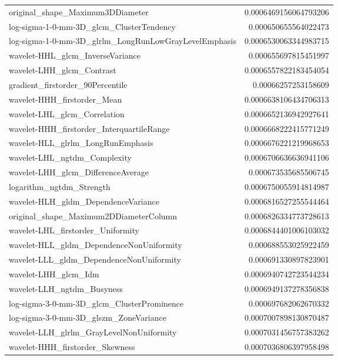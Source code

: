 {\begin{xltabular}[H]{\textwidth}{X r}
        original\_shape\_Maximum3DDiameter & 0.0006469156064793206 \\
        log-sigma-1-0-mm-3D\_glcm\_ClusterTendency & 0.000650655564022473 \\
        log-sigma-1-0-mm-3D\_glrlm\_LongRunLowGrayLevelEmphasis & 0.0006530063344983715 \\
        wavelet-HHL\_glcm\_InverseVariance & 0.000655697815451997 \\
        wavelet-LHH\_glcm\_Contrast & 0.0006557822183454054 \\
        gradient\_firstorder\_90Percentile & 0.00066257253158609 \\
        wavelet-HHH\_firstorder\_Mean & 0.0006638106434706313 \\
        wavelet-LHL\_glcm\_Correlation & 0.0006652136942927641 \\
        wavelet-HHH\_firstorder\_InterquartileRange & 0.0006668222415771249 \\
        wavelet-HLL\_glrlm\_LongRunEmphasis & 0.0006676221219968653 \\
        wavelet-LHL\_ngtdm\_Complexity & 0.0006706636636941106 \\
        wavelet-LHH\_glcm\_DifferenceAverage & 0.000673535685506745 \\
        logarithm\_ngtdm\_Strength & 0.0006750055914814987 \\
        wavelet-HLH\_gldm\_DependenceVariance & 0.0006816527255544464 \\
        original\_shape\_Maximum2DDiameterColumn & 0.0006826334773728613 \\
        wavelet-LHL\_firstorder\_Uniformity & 0.0006844401006103032 \\
        wavelet-HLL\_gldm\_DependenceNonUniformity & 0.000688553025922459 \\
        wavelet-LLL\_gldm\_DependenceNonUniformity & 0.000691330897823901 \\
        wavelet-LHH\_glcm\_Idm & 0.0006940742723544234 \\
        wavelet-LLH\_ngtdm\_Busyness & 0.0006949137278356838 \\
        log-sigma-3-0-mm-3D\_glcm\_ClusterProminence & 0.000697682062670332 \\
        log-sigma-3-0-mm-3D\_glszm\_ZoneVariance & 0.0007007898130870487 \\
        wavelet-LLH\_glrlm\_GrayLevelNonUniformity & 0.0007031456757383262 \\
        wavelet-HHH\_firstorder\_Skewness & 0.0007036806397958498 \\

\end{xltabular}}
